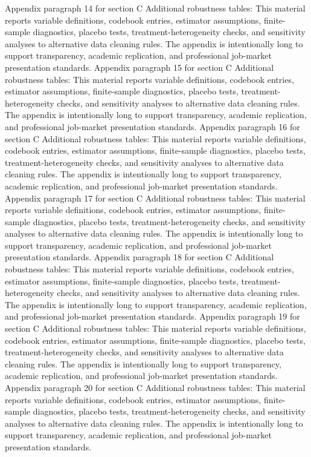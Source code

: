 \documentclass[preprint,12pt]{elsarticle}
\begin{document}
Appendix paragraph 14 for section C Additional robustness tables: This material reports variable definitions, codebook entries, estimator assumptions, finite-sample diagnostics, placebo tests, treatment-heterogeneity checks, and sensitivity analyses to alternative data cleaning rules. The appendix is intentionally long to support transparency, academic replication, and professional job-market presentation standards.
Appendix paragraph 15 for section C Additional robustness tables: This material reports variable definitions, codebook entries, estimator assumptions, finite-sample diagnostics, placebo tests, treatment-heterogeneity checks, and sensitivity analyses to alternative data cleaning rules. The appendix is intentionally long to support transparency, academic replication, and professional job-market presentation standards.
Appendix paragraph 16 for section C Additional robustness tables: This material reports variable definitions, codebook entries, estimator assumptions, finite-sample diagnostics, placebo tests, treatment-heterogeneity checks, and sensitivity analyses to alternative data cleaning rules. The appendix is intentionally long to support transparency, academic replication, and professional job-market presentation standards.
Appendix paragraph 17 for section C Additional robustness tables: This material reports variable definitions, codebook entries, estimator assumptions, finite-sample diagnostics, placebo tests, treatment-heterogeneity checks, and sensitivity analyses to alternative data cleaning rules. The appendix is intentionally long to support transparency, academic replication, and professional job-market presentation standards.
Appendix paragraph 18 for section C Additional robustness tables: This material reports variable definitions, codebook entries, estimator assumptions, finite-sample diagnostics, placebo tests, treatment-heterogeneity checks, and sensitivity analyses to alternative data cleaning rules. The appendix is intentionally long to support transparency, academic replication, and professional job-market presentation standards.
Appendix paragraph 19 for section C Additional robustness tables: This material reports variable definitions, codebook entries, estimator assumptions, finite-sample diagnostics, placebo tests, treatment-heterogeneity checks, and sensitivity analyses to alternative data cleaning rules. The appendix is intentionally long to support transparency, academic replication, and professional job-market presentation standards.
Appendix paragraph 20 for section C Additional robustness tables: This material reports variable definitions, codebook entries, estimator assumptions, finite-sample diagnostics, placebo tests, treatment-heterogeneity checks, and sensitivity analyses to alternative data cleaning rules. The appendix is intentionally long to support transparency, academic replication, and professional job-market presentation standards.
\end{document}

